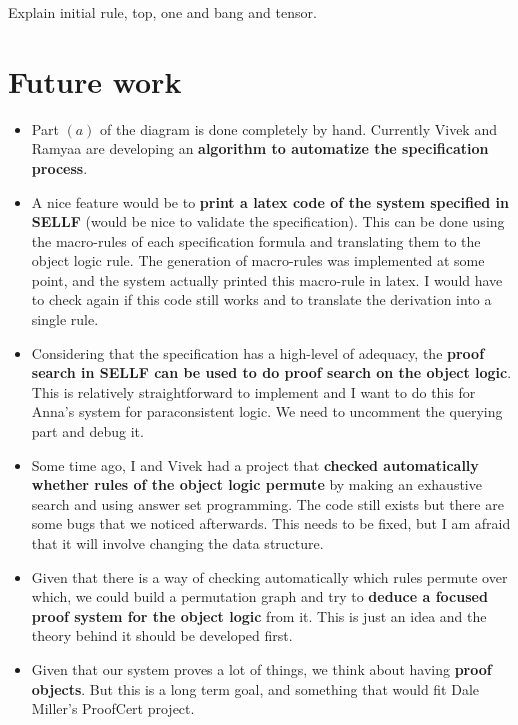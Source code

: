 \documentclass[a4paper, 11pt]{article}
\begin{document}
{\color{red}Explain initial rule, top, one and bang and tensor.}



\section*{Future work}

\begin{itemize}
  \item Part $(a)$ of the diagram is done completely by hand. Currently Vivek
  and Ramyaa are developing an \textbf{algorithm to automatize the specification
  process}.

  \item A nice feature would be to \textbf{print a latex code of the system specified in
  SELLF} (would be nice to validate the specification). This can be done using
  the macro-rules of each specification formula and translating them to the object
  logic rule. The generation of macro-rules was implemented at some point, and
  the system actually printed this macro-rule in latex. I would have to check
  again if this code still works and to translate the derivation into a single
  rule.
  
  \item Considering that the specification has a high-level of adequacy, the
  \textbf{proof search in SELLF can be used to do proof search on the object
  logic}. This
  is relatively straightforward to implement and I want to do this for Anna's
  system for paraconsistent logic. We need to uncomment the querying part and
  debug it.

  \item Some time ago, I and Vivek had a project that \textbf{checked automatically
  whether rules of the object logic permute} by making an exhaustive search and
  using answer set programming. The code still exists but there are some bugs
  that we noticed afterwards. This needs to be fixed, but I am afraid that it
  will involve changing the data structure.

  \item Given that there is a way of checking automatically which rules permute
  over which, we could build a permutation graph and try to \textbf{deduce a focused
  proof system for the object logic} from it. This is just an idea and the
  theory behind it should be developed first.

  \item Given that our system proves a lot of things, we think about having
  \textbf{proof objects}. But this is a long term goal, and something that would
  fit Dale Miller's ProofCert project.
\end{itemize}
\end{document}
